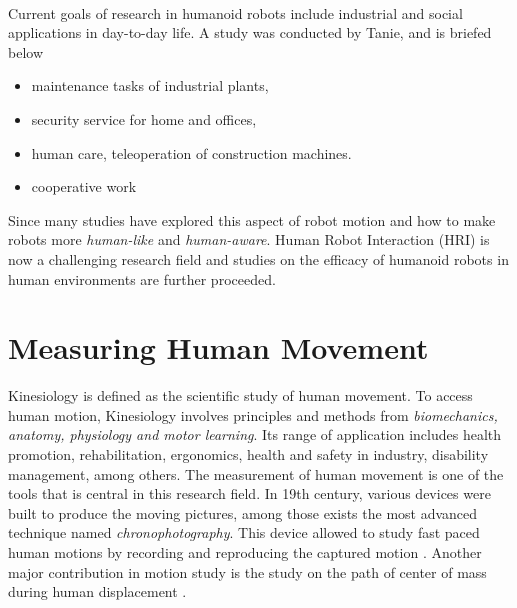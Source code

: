 ~

Current goals of research in humanoid robots include industrial and social applications in day-to-day life. 
A study was conducted by Tanie, \cite{tanie} and is briefed below

\begin{itemize}
\item maintenance tasks of industrial plants,
\item security service for home and offices,
\item human care, teleoperation of construction machines.
\item cooperative work
\end{itemize}

Since many studies have explored this aspect of robot motion and how to make robots more \textit{human-like} and 
\textit{human-aware}. Human Robot Interaction (HRI) is now a challenging research field and studies on the efficacy 
of humanoid robots in human environments are further proceeded.

\section{Measuring Human Movement}

Kinesiology is defined as the scientific study of human movement. To access human motion, Kinesiology involves principles
and methods from \textit{biomechanics, anatomy, physiology and motor learning}. Its range of application includes health
promotion, rehabilitation, ergonomics, health and safety in industry, disability management, among others. The 
measurement of human movement is one of the tools that is central in this research field. In 19th century, various 
devices were built to produce the moving pictures, among those exists the most advanced technique named 
\textit{chronophotography}. This device allowed to study fast paced human motions by recording and reproducing the 
captured motion \cite{RosenhahnBodo2008HMUM}. Another major contribution in motion study is the study on the path of 
center of mass during human displacement \cite{alma991010593879705596}.

~

